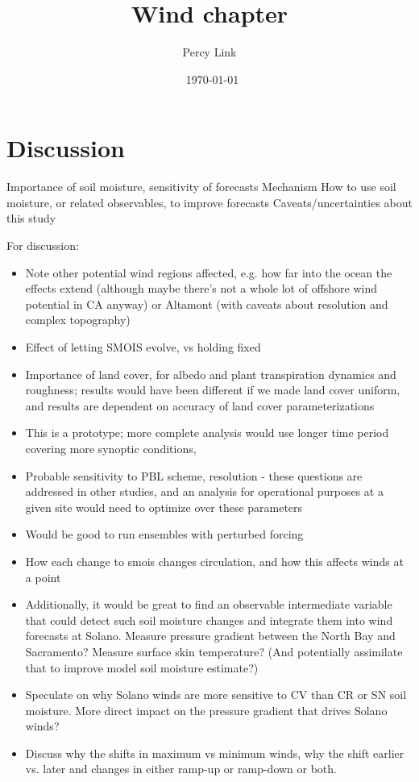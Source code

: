\documentclass[12pt]{amsart}
\title{Wind chapter}
\author{Percy Link}
\date{\currenttime \ \today} %
\begin{document}
\maketitle

\section{Discussion}

Importance of soil moisture, sensitivity of forecasts
Mechanism
How to use soil moisture, or related observables, to improve forecasts
Caveats/uncertainties about this study

For discussion:
\begin{itemize}
\item Note other potential wind regions affected, e.g. how far into the ocean the effects extend (although maybe there's not a whole lot of offshore wind potential in CA anyway) or Altamont (with caveats about resolution and complex topography)
\item Effect of letting SMOIS evolve, vs holding fixed
\item Importance of land cover, for albedo and plant transpiration dynamics and roughness; results would have been different if we made land cover uniform, and results are dependent on accuracy of land cover parameterizations
\item This is a prototype; more complete analysis would use longer time period covering more synoptic conditions, 
\item Probable sensitivity to PBL scheme, resolution - these questions are addressed in other studies, and an analysis for operational purposes at a given site would need to optimize over these parameters
\item Would be good to run ensembles with perturbed forcing
\item How each change to smois changes circulation, and how this affects winds at a point
\item Additionally, it would be great to find an observable intermediate variable that could detect such soil moisture changes and integrate them into wind forecasts at Solano.  Measure pressure gradient between the North Bay and Sacramento?  Measure surface skin temperature?  (And potentially assimilate that to improve model soil moisture estimate?)
\item Speculate on why Solano winds are more sensitive to CV than CR or SN soil moisture.  More direct impact on the pressure gradient that drives Solano winds?
\item Discuss why the shifts in maximum vs minimum winds, why the shift earlier vs. later and changes in either ramp-up or ramp-down or both.

\end{itemize}
\end{document}
